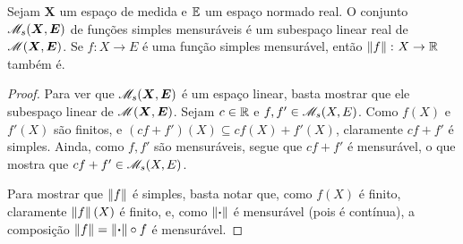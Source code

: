 \begin{proposition}
Sejam $\bm X$ um espaço de medida e $\mathbb{E}$ um espaço normado real. O conjunto $\mathscr{M}_s(\bm X,\bm E)$ de funções simples mensuráveis é um subespaço linear real de $\mathscr{M}(\bm X,\bm E)$. Se $f\colon X \to E$ é uma função simples mensurável, então $\left\Vert{f}\right\Vert\colon X \to \mathbb{R}$ também é.
\end{proposition}
\begin{proof}
Para ver que $\mathscr{M}_s(\bm X,\bm E)$ é um espaço linear, basta mostrar que ele subespaço linear de $\mathscr{M}(\bm X,\bm E)$. Sejam $c \in \mathbb{R}$ e $f,f' \in \mathscr{M}_s(X,E)$. Como $f(X)$ e $f'(X)$ são finitos, e $(cf+f')(X) \subseteq cf(X) + f'(X)$, claramente $cf+f'$ é simples. Ainda, como $f,f'$ são mensuráveis, segue que $cf+f'$ é mensurável, o que mostra que $cf+f' \in \mathscr{M}_s(X,E)$.

Para mostrar que $\left\Vert{f}\right\Vert$ é simples, basta notar que, como $f(X)$ é finito, claramente $\left\Vert{f}\right\Vert(X)$ é finito, e, como $\left\Vert{\bm{\cdot}}\right\Vert$ é mensurável (pois é contínua), a composição $\left\Vert{f}\right\Vert = \left\Vert{\bm{\cdot}}\right\Vert \circ f$ é mensurável.
\end{proof}


